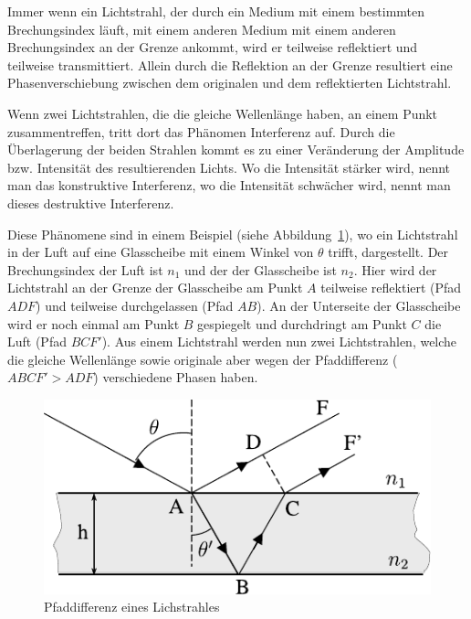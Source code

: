 Immer wenn ein Lichtstrahl, der durch ein Medium mit einem bestimmten Brechungsindex läuft, mit einem anderen Medium mit einem anderen Brechungsindex an der Grenze ankommt, wird er teilweise reflektiert und teilweise transmittiert.
Allein durch die Reflektion an der Grenze resultiert eine Phasenverschiebung zwischen dem originalen und dem reflektierten Lichtstrahl.

Wenn zwei Lichtstrahlen, die die gleiche Wellenlänge haben, an einem Punkt zusammentreffen, tritt dort das Phänomen Interferenz auf.
Durch die Überlagerung der beiden Strahlen kommt es zu einer Veränderung der Amplitude bzw. Intensität des resultierenden Lichts.
Wo die Intensität stärker wird, nennt man das konstruktive Interferenz, wo die Intensität schwächer wird, nennt man dieses destruktive Interferenz.

Diese Phänomene sind in einem Beispiel (siehe Abbildung~\ref{fig:pfadabweichung_des_lichtstrahls}), wo ein Lichtstrahl in der Luft auf eine Glasscheibe mit einem Winkel von $\theta$ trifft, dargestellt.
Der Brechungsindex der Luft ist $n_1$ und der der Glasscheibe ist $n_2$.
Hier wird der Lichtstrahl an der Grenze der Glasscheibe am Punkt $A$ teilweise reflektiert (Pfad $ADF$) und teilweise durchgelassen (Pfad $AB$).
An der Unterseite der Glasscheibe wird er noch einmal am Punkt $B$ gespiegelt und durchdringt am Punkt $C$ die Luft (Pfad $BCF'$).
Aus einem Lichtstrahl werden nun zwei Lichtstrahlen, welche die gleiche Wellenlänge sowie originale aber wegen der Pfaddifferenz ($ABCF' > ADF$) verschiedene Phasen haben.

\begin{figure}[htb]
    \centering
    \includegraphics[]{./images/licht_interferenz_furtuna.pdf}
    \caption{Pfaddifferenz eines Lichstrahles~\cite{furtuna_2011}}
    \label{fig:pfadabweichung_des_lichtstrahls}
\end{figure}


